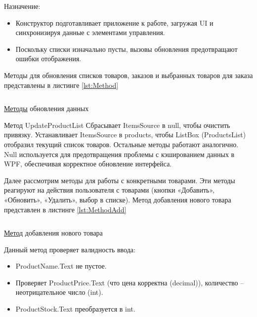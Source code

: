 \documentclass[12pt]{article}
\newcommand{\colorGIT}[1]{\textcolor{CtpLavender}{#1}}
\renewcommand{\texttt}[1]{{\small\ttfamily #1}}
\newenvironment{code}{\captionsetup{type=listing}}{}
\numberwithin{listing}{section}
\numberwithin{figure}{section}
\begin{document}
\noindent Назначение:
\begin{itemize}
	\item Конструктор подготавливает приложение к работе, загружая \texttt{UI} и синхронизируя данные с элементами управления.
	\item Поскольку списки изначально пусты, вызовы обновления предотвращают ошибки отображения.
\end{itemize}

Методы для обновления списков товаров, заказов и выбранных товаров для заказа
представлены в листинге \ref{lst:Method}

\begin{code}
	\inputminted[firstline=32, lastline=51]{csharp}{../../3lab/StoreManager/MainWindow.xaml.cs}
	\caption{\colorGIT{\href{https://github.com/WebMasterIT/Csharp_Labs/blob/ec375afd16c0647b337cf3d8a79c8bef904fc1be/3lab/StoreManager/MainWindow.xaml.cs\#L32-L51}{Методы}} обновления данных}
	\label{lst:Method}
\end{code}

Метод \texttt{UpdateProductList} Сбрасывает \texttt{ItemsSource} в \texttt{null}, чтобы очистить привязку. Устанавливает \texttt{ItemsSource} в \texttt{products}, чтобы \texttt{ListBox} (\texttt{ProductsList}) отобразил текущий список товаров. Остальные методы работают аналогично. \texttt{Null} используется для предотвращения проблемы с кэшированием данных в \texttt{WPF}, обеспечивая корректное обновление интерфейса.

{}

Далее рассмотрим методы для работы с конкретными товарами. Эти методы реагируют на действия пользователя с товарами (кнопки «Добавить», «Обновить», «Удалить», выбор в списке). Метод добавления нового товара представлен в листинге \ref{lst:MethodAdd}

\begin{code}
	\inputminted[firstline=53, lastline=80]{csharp}{../../3lab/StoreManager/MainWindow.xaml.cs}
	\caption{\colorGIT{\href{https://github.com/WebMasterIT/Csharp_Labs/blob/ec375afd16c0647b337cf3d8a79c8bef904fc1be/3lab/StoreManager/MainWindow.xaml.cs\#L53-L80}{Метод}} добавления нового товара}
	\label{lst:MethodAdd}
\end{code}

\noindent Данный метод проверяет валидность ввода:
\begin{itemize}
	\item \texttt{ProductName.Text} не пустое.
	\item Проверяет \texttt{ProductPrice.Text} (что цена корректна (\texttt{decimal})), количество -- неотрицательное число (\texttt{int}).
	\item \texttt{ProductStock.Text} преобразуется в \texttt{int}.
\end{itemize}
\end{document}

